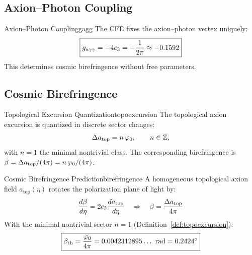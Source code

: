 \subsection{Axion--Photon Coupling}

\begin{corollary}{Axion--Photon Coupling}{gagg}
The CFE fixes the axion--photon vertex uniquely:
\begin{equation}
    \boxed{g_{a\gamma\gamma} = -4c_3 = -\frac{1}{2\pi} \approx -0.1592}
\end{equation}
This determines cosmic birefringence without free parameters.
\end{corollary}

\subsection{Cosmic Birefringence}

\begin{definition}{Topological Excursion Quantization}{topoexcursion}
The topological axion excursion is quantized in discrete sector changes:
\begin{equation}
    \Delta a_{\text{top}} = n\,\varphi_0, \qquad n\in\mathbb{Z},
\end{equation}
with $n=1$ the minimal nontrivial class. The corresponding birefringence is
$\beta = \Delta a_{\text{top}}/(4\pi) = n\,\varphi_0/(4\pi)$.
\end{definition}

\begin{theorem}{Cosmic Birefringence Prediction}{birefringence}
A homogeneous topological axion field $a_{\text{top}}(\eta)$ rotates the polarization plane of light by:
\begin{equation}
    \frac{d\beta}{d\eta} = 2c_3\frac{da_{\text{top}}}{d\eta} 
    \quad\Rightarrow\quad 
    \beta = \frac{\Delta a_{\text{top}}}{4\pi}
\end{equation}
With the minimal nontrivial sector $n=1$ (Definition~\ref{def:topoexcursion}):
\begin{equation}
    \boxed{\beta_{\text{th}} = \frac{\varphi_0}{4\pi} = 0.0042312895\ldots~\text{rad} = 0.2424^\circ}
\end{equation}
\end{theorem}


